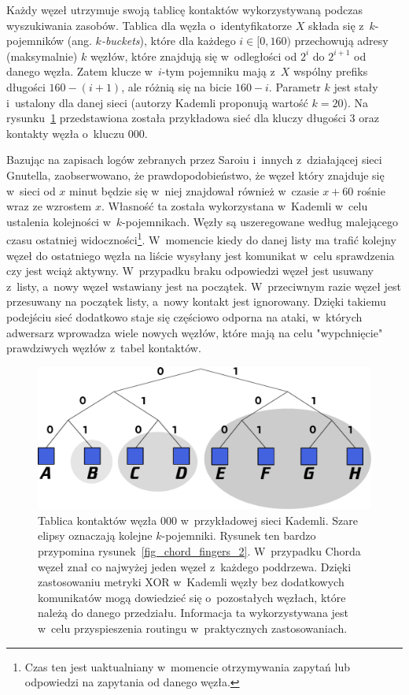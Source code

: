 \documentclass[a4paper,11pt]{scrartcl}
\begin{document}
Każdy węzeł utrzymuje swoją tablicę kontaktów wykorzystywaną podczas wyszukiwania zasobów. Tablica dla węzła o~identyfikatorze $X$ składa się z~$k$-pojemników (ang. \textit{$k$-buckets}), które dla każdego $i \in [0, 160)$ przechowują adresy (maksymalnie) $k$ węzłów, które znajdują się w~odległości od $2^i$ do $2^{i+1}$ od danego węzła. Zatem klucze w~$i$-tym pojemniku mają z~$X$ wspólny prefiks długości $160-(i+1)$, ale różnią się na bicie $160-i$. Parametr $k$ jest stały i~ustalony dla danej sieci (autorzy Kademli proponują wartość $k=20$). Na rysunku~\ref{fig_kademlia} przedstawiona została przykładowa sieć dla kluczy długości $3$ oraz kontakty węzła o~kluczu $000$. 

Bazując na zapisach logów zebranych przez Saroiu i~innych \cite{saroiu2001measurement} z~działającej sieci Gnutella, zaobserwowano, że prawdopodobieństwo, że węzeł który znajduje się w~sieci od $x$ minut będzie się w~niej znajdował również w~czasie $x+60$ rośnie wraz ze wzrostem $x$. Własność ta została wykorzystana w~Kademli w~celu ustalenia kolejności w~$k$-pojemnikach. Węzły są uszeregowane według malejącego czasu ostatniej widoczności\footnote{Czas ten jest uaktualniany w~momencie otrzymywania zapytań lub odpowiedzi na zapytania od danego węzła.}. W~momencie kiedy do danej listy ma trafić kolejny węzeł do ostatniego węzła na liście wysyłany jest komunikat w~celu sprawdzenia czy jest wciąż aktywny. W~przypadku braku odpowiedzi węzeł jest usuwany z~listy, a~nowy węzeł wstawiany jest na początek. W~przeciwnym razie węzeł jest przesuwany na początek listy, a~nowy kontakt jest ignorowany. Dzięki takiemu podejściu sieć dodatkowo staje się częściowo odporna na ataki, w~których adwersarz wprowadza wiele nowych węzłów, które mają na celu "wypchnięcie" prawdziwych węzłów z~tabel kontaktów.

\begin{figure}[h]
\centering
\includegraphics[width=0.9\linewidth]{img/kademlia.pdf}
\caption{Tablica kontaktów węzła $000$ w~przykładowej sieci Kademli. Szare elipsy oznaczają kolejne $k$-pojemniki. Rysunek ten bardzo przypomina rysunek~\ref{fig_chord_fingers_2}. W~przypadku Chorda węzeł znał co najwyżej jeden węzeł z~każdego poddrzewa. Dzięki zastosowaniu metryki XOR w~Kademli węzły bez dodatkowych komunikatów mogą dowiedzieć się o~pozostałych węzłach, które należą do danego przedziału. Informacja ta wykorzystywana jest w~celu przyspieszenia routingu w~praktycznych zastosowaniach.}
\label{fig_kademlia}
\end{figure}
\end{document}
